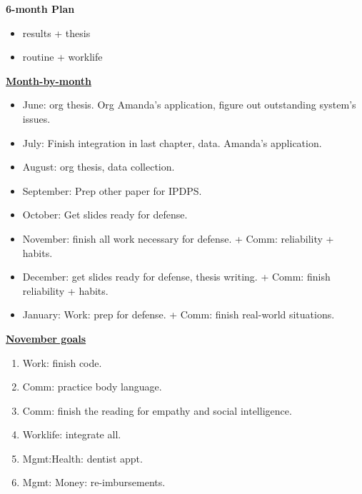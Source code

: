 \documentclass[11pt]{article}
\begin{document}
\textbf{6-month Plan} 
\begin{itemize} 
  \tiny \item \tiny results + thesis
\item \tiny routine + worklife
\end{itemize}

 
           {\small \underline{\textbf{Month-by-month}}}
           \begin{itemize}
             \small \item \small June: org thesis. Org Amanda's application, figure out outstanding system's issues.
           \item \small July: Finish integration in last chapter, data. Amanda's application. 
           \item \small August: org thesis, data collection.
           \item \small September: Prep other paper for IPDPS.
           \item \small October: Get slides ready for defense. 
           \item \small November: finish all work necessary for defense.  + Comm: reliability + habits. 
           \item \small December: get slides ready for defense, thesis writing.  + Comm: finish reliability + habits.  
           \item \small January: Work: prep for defense.  +  Comm:  finish real-world situations. 
           \end{itemize} 
           
           \newpage 
               {\small \underline{\textbf{November goals}}}
               \begin{enumerate}
                 \small \item \small Work: finish code.
               \item \small Comm: practice body language.
               \item \small Comm: finish the reading for empathy and social intelligence.
               \item \small Worklife: integrate all.
               \item \small Mgmt:Health: dentist appt.
               \item \small Mgmt: Money: re-imbursements.  
               \end{enumerate} 
\end{document}
